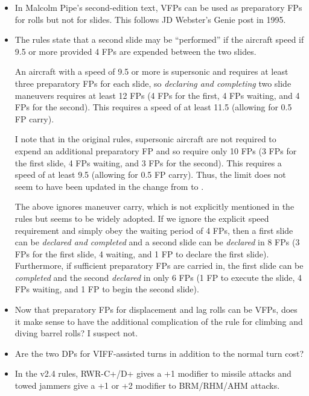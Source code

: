 \documentclass[10pt]{report}
\begin{document}
\begin{itemize}
\item In Malcolm Pipe's second-edition text, VFPs can be used as preparatory FPs for rolls but not for slides. This follows JD Webster's Genie post in 1995.

\item The rules state that a second slide may be “performed” if the aircraft speed if 9.5 or more provided 4 FPs are expended between the two slides. 

An aircraft with a speed of 9.5 or more is supersonic and requires at least three preparatory FPs for each slide, so \emph{declaring and completing} two slide maneuvers requires at least 12 FPs (4 FPs for the first, 4 FPs waiting, and 4 FPs for the second). This requires a speed of at least 11.5 (allowing for 0.5 FP carry). 

I note that in the original {\AirSup} rules, supersonic aircraft are not required to expend an additional preparatory FP and so require only 10 FPs (3 FPs for the first slide, 4 FPs waiting, and 3 FPs for the second). This requires a speed of at least 9.5 (allowing for 0.5 FP carry). Thus, the limit does not seem to have been updated in the change from {\AirSup} to {\AirPow}.

The above ignores maneuver carry, which is not explicitly mentioned in the rules but seems to be widely adopted. If we ignore the explicit speed requirement and simply obey the waiting period of 4 FPs, then a first slide can be \emph{declared and completed} and a second slide can be \emph{declared} in 8 FPs (3 FPs for the first slide, 4 waiting, and 1 FP to declare the first slide). Furthermore, if sufficient preparatory FPs are carried in, the first slide can be \emph{completed} and the second \emph{declared} in only 6 FPs (1 FP to execute the slide, 4 FPs waiting, and 1 FP to begin the second slide).

\item Now that preparatory FPs for displacement and lag rolls can be VFPs, does it make sense to have the additional complication of the rule for climbing and diving barrel rolls? I suspect not.

\item Are the two DPs for VIFF-assisted turns in addition to the normal turn cost?

\item In the v2.4 rules, RWR-C+/D+ gives a +1 modifier to missile attacks and towed jammers give a +1 or +2 modifier to BRM/RHM/AHM attacks.

\end{itemize}
\end{document}
